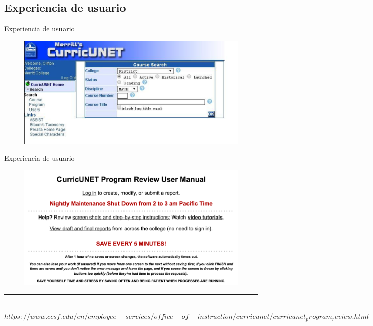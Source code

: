 \documentclass[10pt,xcolor=table ]{beamer}
\newcommand{\decoRule}{\rule{\textwidth}{.4pt}} %
\begin{document}
\subsection{Experiencia de usuario}
\begin{frame}{Experiencia de usuario}
	\begin{figure}[H]
			\centering
			\includegraphics[scale=0.4]{../Figuras/curricunet/curricunet_example}
	\end{figure}
	
\end{frame}

\begin{frame}{Experiencia de usuario}
	\begin{figure}[H]
			\centering
			\includegraphics[scale=0.65]{../Figuras/curricunet/curricunet_example_2}
	\end{figure}
	\decoRule \\
  \tiny \textit{$https://www.ccsf.edu/en/employee-services/office-of-instruction/curricunet/curricunet_program_review.html$} \\
\end{frame}
\end{document}
